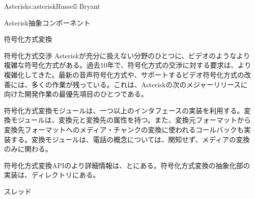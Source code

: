 \begin{aosachapter}{Asterisk}{s:asterisk}{Russell Bryant}
\begin{aosasect1}{Asterisk抽象コンポーネント}
\begin{aosasect2}{符号化方式変換}
\begin{aosabox}{符号化方式交渉}
Asteriskが充分に扱えない分野のひとつに、ビデオのようなより複雑な符号化方式がある。過去10年で、符号化方式の交渉に対する要求は、より複雑化してきた。最新の音声符号化方式や、サポートするビデオ符号化方式の改善には、多くの作業が残っている。これは、Asteriskの次のメジャーリリースに向けた開発作業の最優先項目のひとつである。

\end{aosabox}

符号化方式変換モジュールは、一つ以上のインタフェースの実装を利用する。変換モジュールは、変換元と変換先の属性を持つ。また、変換元フォーマットから変換先フォーマットへのメディア・チャンクの変換に使われるコールバックも実装する。変換モジュールは、電話の概念については、関知せず、メディアの変換のみに関わる。

符号化方式変換APIのより詳細情報は、とにある。符号化方式変換の抽象化部の実装は、ディレクトリにある。

\end{aosasect2}

\end{aosasect1}

\begin{aosasect1}{スレッド}


\end{aosasect1}
\end{aosachapter}
